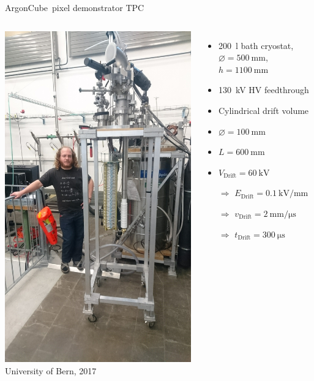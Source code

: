 \documentclass[]{beamer}
\newcommand*{\m}{\mathrm}
\newcommand*{\emphcol}{blue}
\newcommand*{\AC}{{ArgonCube}}
\begin{document}
\begin{frame}{\AC\ pixel demonstrator TPC}
	\begin{columns}[c]
		\centering
		\includegraphics[viewport=1200 200 2500 1800, clip, height=\textwidth, angle=-90]{defence/TPC}\\
		{\tiny University of Bern, 2017}\\
		\begin{itemize}
			\item \SI{200}{\litre} bath cryostat, $\varnothing = \SI{500}{\milli\meter}$, $h = \SI{1100}{\milli\metre}$
			\item \SI{130}{\kilo\volt} HV feedthrough
			\item Cylindrical drift volume
			\item $\varnothing = \SI{100}{\milli\meter}$
			\item $L = \SI{600}{\milli\meter}$
			\item $V_{\m{Drift}} = \SI{60}{\kilo\volt}$
			\item[$\Rightarrow$] {\color{\emphcol} $E_{\m{Drift}} = \SI{0.1}{\kilo\volt\per\milli\meter}$}
			\item[$\Rightarrow$] $v_{\m{Drift}} = \SI{2}{\milli\meter\per\micro\second}$
			\item[$\Rightarrow$] {\color{\emphcol} $t_{\m{Drift}} = \SI{300}{\micro\second}$}
		\end{itemize}
	\end{columns}
\end{frame}
\end{document}
